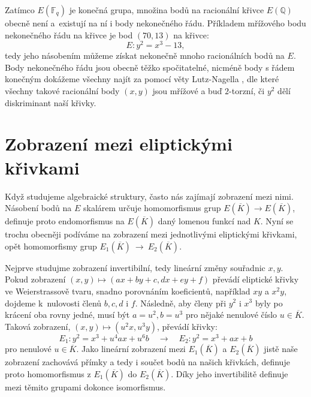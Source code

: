 \documentclass[12pt]{report}
\begin{document}
Zatímco $E(\mathbb{F}_q)$ je konečná grupa, množina bodů na racionální křivce $E(\mathbb{Q})$ obecně není a~existují na ní i body nekonečného řádu. Příkladem mřížového bodu nekonečného řádu na křivce je bod $(70,13)$ na křivce:
\begin{equation*}
E : y^2 = x^3 - 13,
\end{equation*}
tedy jeho násobením můžeme získat nekonečně mnoho racionálních bodů na $E$. Body nekonečného řádu jsou obecně těžko spočitatelné, nicméně body s řádem konečným dokážeme všechny najít za pomocí věty Lutz-Nagella \cite[Thm. 8.7]{Washington}, dle které všechny takové racionální body $(x,y)$ jsou mřížové a buď $2$-torzní, či $y^2$ dělí diskriminant naší křivky.

\section{Zobrazení mezi eliptickými křivkami}

Když studujeme algebraické struktury, často nás zajímají zobrazení mezi nimi. Násobení bodů na $E$ skalárem určuje homomorfismus grup $E(\overline{K}) \longrightarrow E(\overline{K})$, definuje proto endomorfismus na $E(\overline{K})$ daný lomenou funkcí nad $K$. Nyní se trochu obecněji podíváme na zobrazení mezi jednotlivými eliptickými křivkami, opět homomorfismy grup $E_1(\overline{K})~\longrightarrow~E_2(\overline{K})$.

Nejprve studujme zobrazení invertibilní, tedy lineární změny souřadnic $x,y$. Pokud zobrazení $(x,y) \mapsto (ax+by+c,dx+ey+f)$ převádí eliptické křivky ve Weierstrassově tvaru, snadno porovnáním koeficientů, například $xy$ a $x^2 y$, dojdeme k~nulovosti členů $b,c,d$ i $f$. Následně, aby členy při $y^2$ i $x^3$ byly po krácení oba rovny jedné, musí být $a = u^2, b = u^3$ pro nějaké nenulové číslo $u \in \overline{K}$. Taková zobrazení, $(x,y) \mapsto (u^2 x, u^3 y)$, převádí křivky:
\begin{equation*}
E_1 : y^2 = x^3 + u^4 a x + u^6 b \quad \longrightarrow \quad E_2 :  y^2 = x^3 + ax + b 
\end{equation*}
pro nenulové $u \in \overline{K}$. Jako lineární zobrazení mezi $E_1(\overline{K})$ a $E_2(\overline{K})$ jistě naše zobrazení zachovává přímky a tedy i součet bodů na našich křivkách, definuje proto homomorfismus z $E_1(\overline{K})$ do $E_2(\overline{K})$. Díky jeho invertibilitě definuje mezi těmito grupami dokonce isomorfismus.
\end{document}
